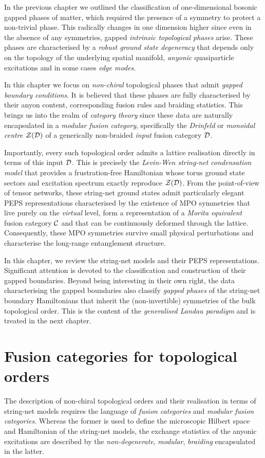 In the previous chapter we outlined the classification of one-dimensional bosonic gapped phases of matter, which required the presence of a symmetry to protect a non-trivial phase. This radically changes in one dimension higher since even in the absence of any symmetries, gapped \emph{intrinsic topological phases} arise. These phases are characterised by a \emph{robust ground state degeneracy} that depends only on the topology of the underlying spatial manifold, \emph{anyonic} quasiparticle excitations and in some cases \emph{edge modes}.

In this chapter we focus on \emph{non-chiral} topological phases that admit \emph{gapped boundary conditions}. It is believed that these phases are fully characterised by their anyon content, corresponding fusion rules and braiding statistics. This brings us into the realm of \emph{category theory} since these data are naturally encapsulated in a \emph{modular fusion category}, specifically the \emph{Drinfeld} or \emph{monoidal centre} $\mathcal{Z}(\mathcal{D})$ of a generically non-braided \emph{input} fusion category $\mathcal{D}$.

Importantly, every such topological order admits a lattice realisation directly in terms of this input $\mathcal{D}$. This is precisely the \emph{Levin-Wen string-net condensation model} that provides a frustration-free Hamiltonian whose torus ground state sectors and excitation spectrum exactly reproduce $\mathcal{Z}(\mathcal{D})$. From the point-of-view of tensor networks, these string-net ground states admit particularly elegant PEPS representations characterised by the existence of MPO symmetries that live purely on the \emph{virtual} level, form a representation of a \emph{Morita equivalent} fusion category $\mathcal{C}$ and that can be continuously deformed through the lattice. Consequently, these MPO symmetries survive small physical perturbations and characterise the long-range entanglement structure.

\bigskip\noindent In this chapter, we review the string-net models and their PEPS representations. Significant attention is devoted to the classification and construction of their gapped boundaries. Beyond being interesting in their own right, the data characterising the gapped boundaries also classify \emph{gapped phases} of the string-net boundary Hamiltonians that inherit the (non-invertible) symmetries of the bulk topological order. This is the content of the \emph{generalised Landau paradigm} and is treated in the next chapter.
\section{Fusion categories for topological orders}
The description of non-chiral topological orders and their realisation in terms of string-net models requires the language of \emph{fusion categories} and \emph{modular fusion categories}.  Whereas the former is used to define the microscopic Hilbert space and Hamiltonian of the string-net models, the exchange statistics of the anyonic excitations are described by the \emph{non-degenerate}, \emph{modular}, \emph{braiding} encapsulated in the latter.

